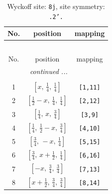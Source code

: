 \documentclass[fleqn,8pt]{jsarticle}
\begin{document}
\begin{longtable}{ccc}
\caption{Wyckoff site: {\tt 8j}, site symmetry: {\tt .2'.}}
 \\
 \hline \hline
No. & position & mapping \\ \hline \endfirsthead

\multicolumn{2}{l}{\tablename\ \thetable{}} \\
 \hline \hline
No. & position & mapping \\ \hline \endhead

 \hline \hline
\multicolumn{2}{r}{\footnotesize\it continued ...} \\ \endfoot

 \hline \hline
\multicolumn{2}{r}{} \\ \endlastfoot

1 & $\left[ x,\, \frac{1}{4},\, \frac{1}{4} \right]$ & {\tt [1,11]} \\ \hline
2 & $\left[ \frac{1}{2} - x,\, \frac{1}{4},\, \frac{1}{4} \right]$ & {\tt [2,12]} \\ \hline
3 & $\left[ \frac{1}{4},\, x,\, \frac{3}{4} \right]$ & {\tt [3,9]} \\ \hline
4 & $\left[ \frac{1}{4},\, \frac{1}{2} - x,\, \frac{3}{4} \right]$ & {\tt [4,10]} \\ \hline
5 & $\left[ \frac{3}{4},\, - x,\, \frac{1}{4} \right]$ & {\tt [5,15]} \\ \hline
6 & $\left[ \frac{3}{4},\, x + \frac{1}{2},\, \frac{1}{4} \right]$ & {\tt [6,16]} \\ \hline
7 & $\left[ - x,\, \frac{3}{4},\, \frac{3}{4} \right]$ & {\tt [7,13]} \\ \hline
8 & $\left[ x + \frac{1}{2},\, \frac{3}{4},\, \frac{3}{4} \right]$ & {\tt [8,14]} \\
\end{longtable}
\renewcommand{\arraystretch}{1.2}
\end{document}
